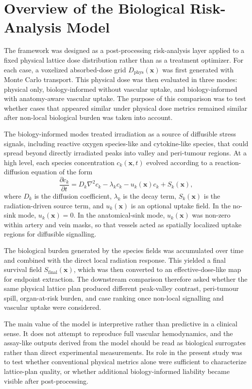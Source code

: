 \section{Overview of the Biological Risk-Analysis Model}

The framework was designed as a post-processing risk-analysis layer applied to a fixed physical lattice dose distribution rather than as a treatment optimizer. For each case, a voxelized absorbed-dose grid $D_{\mathrm{phys}}(\mathbf{x})$ was first generated with Monte Carlo transport. This physical dose was then evaluated in three modes: physical only, biology-informed without vascular uptake, and biology-informed with anatomy-aware vascular uptake. The purpose of this comparison was to test whether cases that appeared similar under physical dose metrics remained similar after non-local biological burden was taken into account.

The biology-informed modes treated irradiation as a source of diffusible stress signals, including reactive oxygen species-like and cytokine-like species, that could spread beyond directly irradiated peaks into valley and peri-tumour regions. At a high level, each species concentration $c_k(\mathbf{x},t)$ evolved according to a reaction-diffusion equation of the form
\begin{equation}
\frac{\partial c_k}{\partial t}
= D_k \nabla^2 c_k - \lambda_k c_k - u_k(\mathbf{x}) c_k + S_k(\mathbf{x}),
\end{equation}
where $D_k$ is the diffusion coefficient, $\lambda_k$ is the decay term, $S_k(\mathbf{x})$ is the radiation-driven source term, and $u_k(\mathbf{x})$ is an optional uptake field. In the no-sink mode, $u_k(\mathbf{x})=0$. In the anatomical-sink mode, $u_k(\mathbf{x})$ was non-zero within artery and vein masks, so that vessels acted as spatially localized uptake regions for diffusible signalling.

The biological burden generated by the species fields was accumulated over time and combined with the direct local radiation response. This yielded a final survival field $S_{\mathrm{final}}(\mathbf{x})$, which was then converted to an effective-dose-like map for endpoint extraction. The downstream comparison therefore asked whether the same physical lattice plan produced different peak-valley contrast, peri-tumour spill, organ-at-risk burden, and case ranking once non-local signalling and vascular uptake were considered.

The main value of the model is interpretive rather than predictive in a clinical sense. It does not attempt to reproduce full vascular hemodynamics, and the assay-like outputs derived from the model should be read as biological surrogates rather than direct experimental measurements. Its role in the present study was to test whether conventional physical metrics alone were sufficient to characterize lattice-plan quality, or whether additional biology-informed liability became visible after post-processing.
